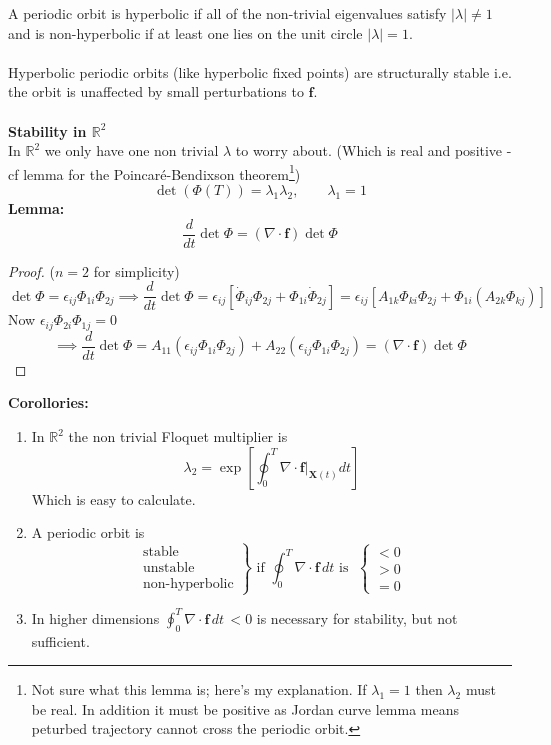 \documentclass{article}
\newcommand{\lemma}{\textbf{Lemma:}}                        %
\newcommand{\rtwo}{\mathbb{R}^2}                            %
\begin{document}
A periodic orbit is hyperbolic if all of the non-trivial eigenvalues
satisfy $|\lambda|\neq 1$ and is non-hyperbolic if at least one lies on
the unit circle $|\lambda|=1$.
\\
\\
Hyperbolic periodic orbits (like hyperbolic fixed points) are structurally
stable i.e. the orbit is unaffected by small perturbations to $\bm{f}$.
\\
\\
\textbf{Stability in $\mathbb{R}^2$}
\\
In $\mathbb{R}^2$ we only have one non trivial $\lambda$ to worry about.
(Which is real and positive -cf lemma for the Poincar\'e-Bendixson
theorem\footnote{ Not sure what this lemma is; here's my explanation.
If $\lambda_1=1$ then $\lambda_2$ must be real. In addition it must be
positive as Jordan curve lemma means peturbed trajectory cannot cross
the periodic orbit.})
\[ \det(\Phi(T)) = \lambda_1 \lambda_2, \qquad \lambda_1=1\]
\lemma\ 
\[ \frac{d}{dt} \det \Phi = (\nabla \cdot \bm{f}) \det \Phi \]
\begin{proof} ($n=2$ for simplicity)
\[ \det \Phi = \epsilon_{ij} \Phi_{1i}\Phi_{2j} \implies \frac{d}{dt} \det \Phi
= \epsilon_{ij}[ \dot{\Phi}_{ij}\Phi_{2j} + \Phi_{1i} \dot{\Phi}_{2j}] = \epsilon_{ij}
[A_{1k} \Phi_{ki} \Phi_{2j} + \Phi_{1i}(A_{2k} \Phi_{kj})] \]
Now $\epsilon_{ij}\Phi_{2i}\Phi_{1j} = 0$
\[ \implies \frac{d}{dt} \det \Phi = A_{11}(\epsilon_{ij} \Phi_{1i}\Phi_{2j}) +
A_{22}(\epsilon_{ij} \Phi_{1i} \Phi_{2j}) = (\nabla \cdot \bm{f}) \det \Phi \]
\end{proof}
\noindent \textbf{Corollories:}
%
\begin{enumerate}[1.]
\item In $\rtwo$ the non trivial Floquet multiplier is
\[ \lambda_2 = \exp\left[ \oint_0^T \left. \nabla \cdot \bm{f} \right|_{\bm{X}(t)} dt \right] \]
Which is easy to calculate.
%
%
\item A periodic orbit is 
\[ \left. \begin{array}{l} \mbox{stable} \\ \mbox{unstable} \\ 
\mbox{non-hyperbolic} \end{array} \right\} \mbox{ if }
\oint_0^T \nabla \cdot \bm{f} \, dt \mbox{ is } \; \left\{ \begin{array}{l} <0 \\
  >0 \\  =0 \end{array} \right. \]
%
%
\item In higher dimensions $\displaystyle \oint_0^T \nabla \cdot \bm{f} \, dt 
\, <0$ is necessary for stability, but not sufficient.
\end{enumerate}
\end{document}
